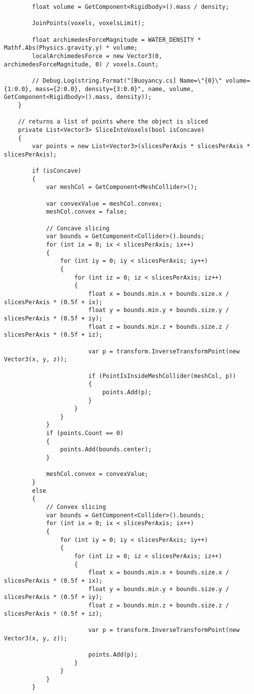 \begin{lstlisting}
		float volume = GetComponent<Rigidbody>().mass / density;

		JoinPoints(voxels, voxelsLimit);

		float archimedesForceMagnitude = WATER_DENSITY * Mathf.Abs(Physics.gravity.y) * volume;
		localArchimedesForce = new Vector3(0, archimedesForceMagnitude, 0) / voxels.Count;

		// Debug.Log(string.Format("[Buoyancy.cs] Name=\"{0}\" volume={1:0.0}, mass={2:0.0}, density={3:0.0}", name, volume, GetComponent<Rigidbody>().mass, density));
	}

	// returns a list of points where the object is sliced
	private List<Vector3> SliceIntoVoxels(bool isConcave)
	{
		var points = new List<Vector3>(slicesPerAxis * slicesPerAxis * slicesPerAxis);

		if (isConcave)
		{
			var meshCol = GetComponent<MeshCollider>();

			var convexValue = meshCol.convex;
			meshCol.convex = false;

			// Concave slicing
			var bounds = GetComponent<Collider>().bounds;
			for (int ix = 0; ix < slicesPerAxis; ix++)
			{
				for (int iy = 0; iy < slicesPerAxis; iy++)
				{
					for (int iz = 0; iz < slicesPerAxis; iz++)
					{
						float x = bounds.min.x + bounds.size.x / slicesPerAxis * (0.5f + ix);
						float y = bounds.min.y + bounds.size.y / slicesPerAxis * (0.5f + iy);
						float z = bounds.min.z + bounds.size.z / slicesPerAxis * (0.5f + iz);

						var p = transform.InverseTransformPoint(new Vector3(x, y, z));

						if (PointIsInsideMeshCollider(meshCol, p))
						{
							points.Add(p);
						}
					}
				}
			}
			if (points.Count == 0)
			{
				points.Add(bounds.center);
			}

			meshCol.convex = convexValue;
		}
		else
		{
			// Convex slicing
			var bounds = GetComponent<Collider>().bounds;
			for (int ix = 0; ix < slicesPerAxis; ix++)
			{
				for (int iy = 0; iy < slicesPerAxis; iy++)
				{
					for (int iz = 0; iz < slicesPerAxis; iz++)
					{
						float x = bounds.min.x + bounds.size.x / slicesPerAxis * (0.5f + ix);
						float y = bounds.min.y + bounds.size.y / slicesPerAxis * (0.5f + iy);
						float z = bounds.min.z + bounds.size.z / slicesPerAxis * (0.5f + iz);

						var p = transform.InverseTransformPoint(new Vector3(x, y, z));

						points.Add(p);
					}
				}
			}
		}


\end{lstlisting}
